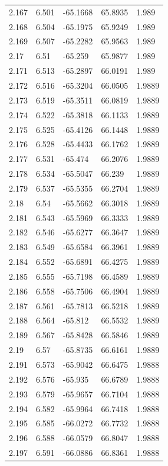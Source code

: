 \begin{tabular}{lllll}
2.167 & 6.501 & -65.1668 & 65.8935 & 1.989 \\
2.168 & 6.504 & -65.1975 & 65.9249 & 1.989 \\
2.169 & 6.507 & -65.2282 & 65.9563 & 1.989 \\
2.17 & 6.51 & -65.259 & 65.9877 & 1.989 \\
2.171 & 6.513 & -65.2897 & 66.0191 & 1.989 \\
2.172 & 6.516 & -65.3204 & 66.0505 & 1.9889 \\
2.173 & 6.519 & -65.3511 & 66.0819 & 1.9889 \\
2.174 & 6.522 & -65.3818 & 66.1133 & 1.9889 \\
2.175 & 6.525 & -65.4126 & 66.1448 & 1.9889 \\
2.176 & 6.528 & -65.4433 & 66.1762 & 1.9889 \\
2.177 & 6.531 & -65.474 & 66.2076 & 1.9889 \\
2.178 & 6.534 & -65.5047 & 66.239 & 1.9889 \\
2.179 & 6.537 & -65.5355 & 66.2704 & 1.9889 \\
2.18 & 6.54 & -65.5662 & 66.3018 & 1.9889 \\
2.181 & 6.543 & -65.5969 & 66.3333 & 1.9889 \\
2.182 & 6.546 & -65.6277 & 66.3647 & 1.9889 \\
2.183 & 6.549 & -65.6584 & 66.3961 & 1.9889 \\
2.184 & 6.552 & -65.6891 & 66.4275 & 1.9889 \\
2.185 & 6.555 & -65.7198 & 66.4589 & 1.9889 \\
2.186 & 6.558 & -65.7506 & 66.4904 & 1.9889 \\
2.187 & 6.561 & -65.7813 & 66.5218 & 1.9889 \\
2.188 & 6.564 & -65.812 & 66.5532 & 1.9889 \\
2.189 & 6.567 & -65.8428 & 66.5846 & 1.9889 \\
2.19 & 6.57 & -65.8735 & 66.6161 & 1.9889 \\
2.191 & 6.573 & -65.9042 & 66.6475 & 1.9888 \\
2.192 & 6.576 & -65.935 & 66.6789 & 1.9888 \\
2.193 & 6.579 & -65.9657 & 66.7104 & 1.9888 \\
2.194 & 6.582 & -65.9964 & 66.7418 & 1.9888 \\
2.195 & 6.585 & -66.0272 & 66.7732 & 1.9888 \\
2.196 & 6.588 & -66.0579 & 66.8047 & 1.9888 \\
2.197 & 6.591 & -66.0886 & 66.8361 & 1.9888 \\

\end{tabular}
